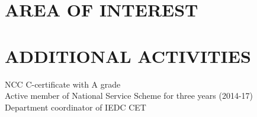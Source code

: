 \documentclass[margin]{res}
\begin{document}
\begin{resume}
\section{AREA OF INTEREST}
    \sl {}
\section{ADDITIONAL ACTIVITIES}
    \textbullet{} NCC C-certificate with A grade \\
    \textbullet{} Active member of National Service Scheme for three years (2014-17) \\
    \textbullet{} Department coordinator of IEDC CET \\



\end{resume}
\end{document}
